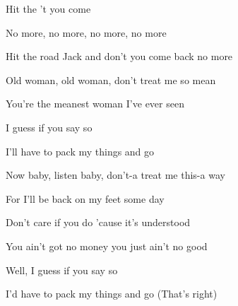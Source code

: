 
\zr
Hit the   't you come 

No more, no more, no more, no more

Hit the road Jack and don't you come back no more

\kr
\zs

Old woman, old woman, don't treat me so mean

You're the meanest woman I've ever seen

I guess if you say so

I'll have to pack my things and go

\ks
\zr
\kr
\zs

Now baby, listen baby, don't-a treat me this-a way

For I'll be back on my feet some day

Don't care if you do 'cause it's understood

You ain't got no money you just ain't no good


Well, I guess if you say so

I'd have to pack my things and go (That's right)

\ks

\zr
\kr

\zr
\kr

\kp



